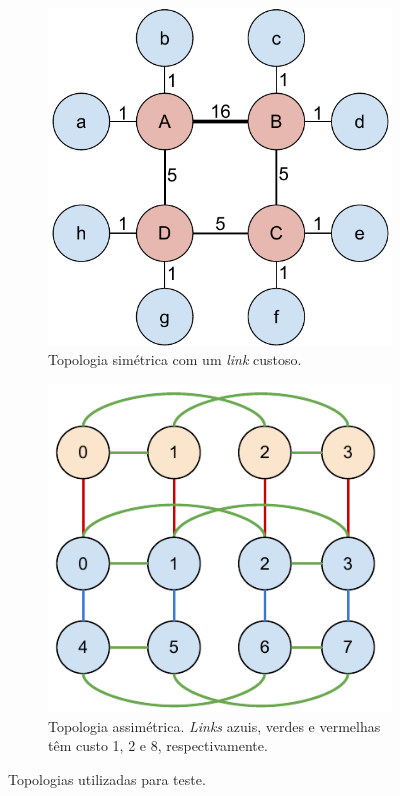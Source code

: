 \begin{figure}[h]
\begin{subfigure}{.5\textwidth}
    \centering
    \includegraphics[width=0.8\linewidth]{images/testes_topo_uneven.pdf}
    \caption{Topologia simétrica com um \textit{link} custoso.}
    \label{fig:tested_topologies:small}
\end{subfigure}
\begin{subfigure}{.5\textwidth}
    \centering
    \includegraphics[width=0.8\linewidth]{images/testes_real_topo_no_links.pdf}
    \caption{Topologia assimétrica. \textit{Links} azuis, verdes e vermelhas têm custo 1, 2 e 8, respectivamente.}
    \label{fig:tested_topologies:real}
\end{subfigure}
\caption[Topologias utilizadas para teste.]{Topologias utilizadas para teste.}
\label{fig:tested_topologies}
\end{figure}

